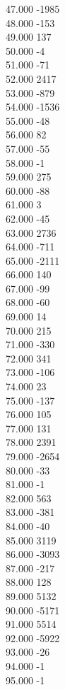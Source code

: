 { 47.000	-1985 \\
 48.000	-153 \\
 49.000	137 \\
 50.000	-4 \\
 51.000	-71 \\
 52.000	2417 \\
 53.000	-879 \\
 54.000	-1536 \\
 55.000	-48 \\
 56.000	82 \\
 57.000	-55 \\
 58.000	-1 \\
 59.000	275 \\
 60.000	-88 \\
 61.000	3 \\
 62.000	-45 \\
 63.000	2736 \\
 64.000	-711 \\
 65.000	-2111 \\
 66.000	140 \\
 67.000	-99 \\
 68.000	-60 \\
 69.000	14 \\
 70.000	215 \\
 71.000	-330 \\
 72.000	341 \\
 73.000	-106 \\
 74.000	23 \\
 75.000	-137 \\
 76.000	105 \\
 77.000	131 \\
 78.000	2391 \\
 79.000	-2654 \\
 80.000	-33 \\
 81.000	-1 \\
 82.000	563 \\
 83.000	-381 \\
 84.000	-40 \\
 85.000	3119 \\
 86.000	-3093 \\
 87.000	-217 \\
 88.000	128 \\
 89.000	5132 \\
 90.000	-5171 \\
 91.000	5514 \\
 92.000	-5922 \\
 93.000	-26 \\
 94.000	-1 \\
 95.000	-1 \\
}
